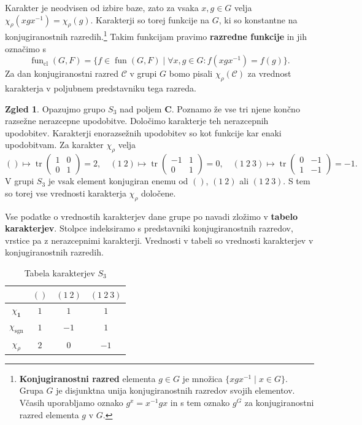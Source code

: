 \documentclass[11pt]{book}
\def\CC{\mathbf{C}}
\def\conclass{\mathcal{C}}
\def\oneone{\mathbf{1}}
\DeclareMathOperator\sgn{sgn}
\DeclareMathOperator\tr{tr}
\DeclareMathOperator\cl{cl}
\DeclareMathOperator\fun{fun}
\def\definicija{\color{rdeca}\bf}
\theoremstyle{definition}
\theoremstyle{zgled}
\newtheorem{zgled}[theorem]{Zgled}
\theoremstyle{zgledbrezstevilke}
\theoremstyle{odprtproblem}
\theoremstyle{domacanaloga}
\theoremstyle{izrek}
\begin{document}
Karakter je neodvisen od izbire baze, zato za vsaka $x, g \in G$ velja $\chi_{\rho}(x g x^{-1}) = \chi_{\rho}(g)$. Karakterji so torej funkcije na $G$, ki so konstantne na konjugiranostnih razredih.\footnote{{\definicija Konjugiranostni razred} elementa $g \in G$ je množica $\{ x g x^{-1} \mid x \in G \}$. Grupa $G$ je disjunktna unija konjugiranostnih razredov svojih elementov. Včasih uporabljamo oznako $g^x = x^{-1} g x$ in s tem oznako $g^G$ za konjugiranostni razred elementa $g$ v $G$.} Takim funkcijam pravimo {\definicija razredne funkcije} in jih označimo s
\[
    \fun_{\cl}(G,F) = \{ f \in \fun(G,F) \mid \forall x, g \in G \colon f(x g x^{-1}) = f(g) \}.
\]
Za dan konjugiranostni razred $\conclass$ v grupi $G$ bomo pisali $\chi_{\rho}(\conclass)$ za vrednost karakterja v poljubnem predstavniku tega razreda.

\begin{zgled}
Opazujmo grupo $S_3$ nad poljem $\CC$. Poznamo že vse tri njene končno razsežne nerazcepne upodobitve. Določimo karakterje teh nerazcepnih upodobitev. Karakterji enorazsežnih upodobitev so kot funkcije kar enaki upodobitvam. Za karakter $\chi_{\rho}$ velja
\[
    () \mapsto \tr \begin{pmatrix}
        1 & 0 \\ 0 & 1
    \end{pmatrix} = 2, \quad
    (1 \ 2) \mapsto \tr \begin{pmatrix}
        -1 & 1 \\ 0 & 1
    \end{pmatrix} = 0, \quad
    (1 \ 2 \ 3) \mapsto \tr \begin{pmatrix}
        0 & -1 \\ 1 & -1
    \end{pmatrix} = -1.
\]
V grupi $S_3$ je vsak element konjugiran enemu od $()$, $(1 \ 2)$ ali $(1 \ 2 \ 3)$. S tem so torej vse vrednosti karakterja $\chi_{\rho}$ določene.

Vse podatke o vrednostih karakterjev dane grupe po navadi zložimo v {\definicija tabelo karakterjev}. Stolpce indeksiramo s predstavniki konjugiranostnih razredov, vrstice pa z nerazcepnimi karakterji. Vrednosti v tabeli so vrednosti karakterjev v konjugiranostnih razredih.

\begin{table}[t]
     \centering
\begin{tabular}{c|ccc}
     & $()$ & $(1 \ 2)$ & $(1 \ 2 \ 3)$ \\ \hline
     $\chi_{\oneone}$ & $1$ & $1$ & $1$ \\
     $\chi_{\sgn}$ & $1$ & $-1$ & $1$ \\
     $\chi_{\rho}$ & $2$ & $0$ & $-1$ \\
\end{tabular}
\caption{Tabela karakterjev $S_3$}
\end{table}
\end{zgled}
\end{document}
